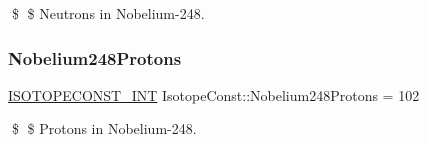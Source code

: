 \$ \$ Neutrons in Nobelium-\/248. \mbox{\label{group___isotope_const-_nobelium-_no248_ga7763e02184e82b9408d87f4eaa9a319f}} 
\subsubsection{\texorpdfstring{Nobelium248\+Protons}{Nobelium248Protons}}
{\footnotesize\ttfamily \mbox{\hyperlink{group___isotope_const-_macros_ga5f18360b3e99483a35c32d789e62621c}{I\+S\+O\+T\+O\+P\+E\+C\+O\+N\+S\+T\+\_\+\+I\+NT}} Isotope\+Const\+::\+Nobelium248\+Protons = 102}

\$ \$ Protons in Nobelium-\/248. 
